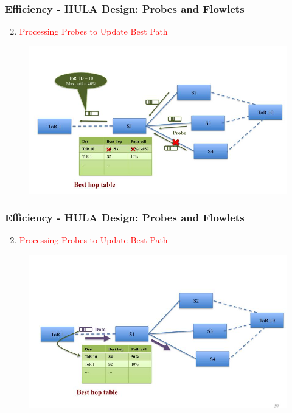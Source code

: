 \documentclass{beamer}
\begin{document}
\begin{frame}
	\frametitle{Efficiency - HULA Design: Probes and Flowlets}
	\begin{enumerate}
		\setcounter{enumi}{1}
		\item\textcolor{red}{Processing Probes to Update Best Path}\\
	\end{enumerate}
	\begin{figure}
		\includegraphics[width=1\linewidth]{11}
	\end{figure}
\end{frame}

\begin{frame}
	\frametitle{Efficiency - HULA Design: Probes and Flowlets}
	\begin{enumerate}
		\setcounter{enumi}{1}
		\item\textcolor{red}{Processing Probes to Update Best Path}\\
	\end{enumerate}
	\begin{figure}
		\includegraphics[width=1\linewidth]{12}
	\end{figure}
\end{frame}
\end{document}
